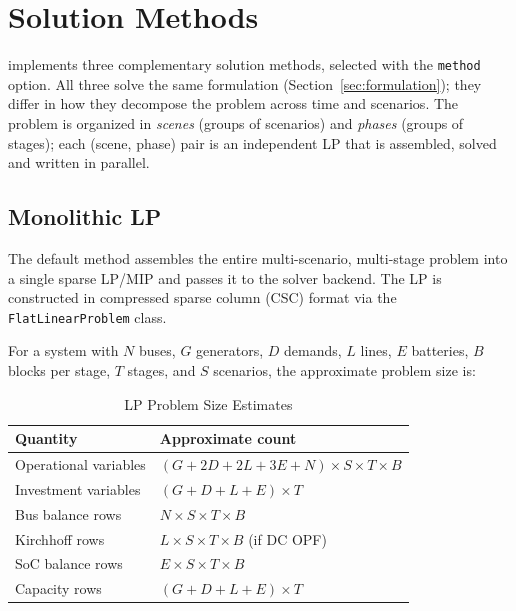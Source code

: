 
\section{Solution Methods}
\label{sec:methods}

\gtopt{} implements three complementary solution methods, selected with
the \texttt{method} option.  All three solve the same formulation
(Section~\ref{sec:formulation}); they differ in how they decompose the
problem across time and scenarios.  The problem is organized in
\emph{scenes} (groups of scenarios) and \emph{phases} (groups of
stages); each (scene, phase) pair is an independent LP that is
assembled, solved and written in parallel.

\subsection{Monolithic LP}
\label{sec:monolithic}

The default method assembles the entire multi-scenario, multi-stage problem
into a single sparse LP/MIP and passes it to the solver backend.  The LP
is constructed in compressed sparse column (CSC) format via the
\texttt{FlatLinearProblem} class.

For a system with $N$ buses, $G$ generators, $D$ demands, $L$ lines,
$E$ batteries, $B$ blocks per stage, $T$ stages, and $S$ scenarios, the
approximate problem size is:

\begin{table}[ht]
  \centering
  \caption{LP Problem Size Estimates}
  \label{tab:lp_size}
  \begin{tabular}{@{}ll@{}}
    \toprule
    Quantity & Approximate count \\
    \midrule
    Operational variables & $(G{+}2D{+}2L{+}3E{+}N) \times S \times T \times B$ \\
    Investment variables  & $(G{+}D{+}L{+}E) \times T$ \\
    Bus balance rows      & $N \times S \times T \times B$ \\
    Kirchhoff rows        & $L \times S \times T \times B$ (if DC OPF) \\
    SoC balance rows      & $E \times S \times T \times B$ \\
    Capacity rows         & $(G{+}D{+}L{+}E) \times T$ \\
    \bottomrule
  \end{tabular}
\end{table}


